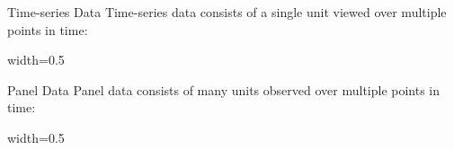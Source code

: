 \documentclass[aspectratio=169,t,11pt,table]{beamer}
\newenvironment{scaledtable}[1]{%
  \begingroup
  \renewenvironment{table}{}{}%
  \begin{center}%
  \begin{adjustbox}{width=#1}%
}{%
  \end{adjustbox}%
  \end{center}%
  \endgroup
}
\begin{document}
\begin{frame}{Time-series Data}
  \alert{Time-series data} consists of a single unit viewed over multiple points in time:

  \vspace*{-\bigskipamount}
  \begin{scaledtable}{0.5\textwidth}
    
  \end{scaledtable}
\end{frame}

\begin{frame}{Panel Data}
  \alert{Panel data} consists of many units observed over multiple points in time:

  \vspace*{-\bigskipamount}
  \begin{scaledtable}{0.5\textwidth}
    
  \end{scaledtable}
\end{frame}
\end{document}
